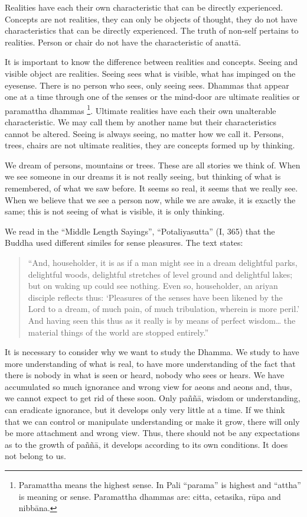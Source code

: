 Realities have each their own characteristic that can be directly
experienced. Concepts are not realities, they can only be objects of
thought, they do not have characteristics that can be directly
experienced. The truth of non-self pertains to realities. Person or
chair do not have the characteristic of anattā.

It is important to know the difference between realities and concepts.
Seeing and visible object are realities. Seeing sees what is visible,
what has impinged on the eyesense. There is no person who sees, only
seeing sees. Dhammas that appear one at a time through one of the senses
or the mind-door are ultimate realities or paramattha dhammas
\footnote{Paramattha means the
highest sense. In Pali ``parama'' is highest and ``attha'' is meaning or
sense. Paramattha dhammas are: citta, cetasika, rūpa and nibbāna.}. Ultimate realities have
each their own unalterable characteristic. We may call them by another
name but their characteristics cannot be altered. Seeing is always
seeing, no matter how we call it. Persons, trees, chairs are not
ultimate realities, they are concepts formed up by thinking.

We dream of persons, mountains or trees. These are all stories we think
of. When we see someone in our dreams it is not really seeing, but
thinking of what is remembered, of what we saw before. It seems so real,
it seems that we really see. When we believe that we see a person now,
while we are awake, it is exactly the same; this is not seeing of what
is visible, it is only thinking.

We read in the ``Middle Length Sayings'', ``Potaliyasutta'' (I, 365)
that the Buddha used different similes for sense pleasures. The text
states:

\begin{quote}
``And, householder, it is as if a man might see in a dream delightful
parks, delightful woods, delightful stretches of level ground and
delightful lakes; but on waking up could see nothing. Even so,
householder, an ariyan disciple reflects thus: `Pleasures of the senses
have been likened by the Lord to a dream, of much pain, of much
tribulation, wherein is more peril.' And having seen this thus as it
really is by means of perfect wisdom\ldots{} the material things of the
world are stopped entirely.''
\end{quote}



It is necessary to consider why we want to study the Dhamma. We study to
have more understanding of what is real, to have more understanding of
the fact that there is nobody in what is seen or heard, nobody who sees
or hears. We have accumulated so much ignorance and wrong view for aeons
and aeons and, thus, we cannot expect to get rid of these soon. Only
paññā, wisdom or understanding, can eradicate ignorance, but it develops
only very little at a time. If we think that we can control or
manipulate understanding or make it grow, there will only be more
attachment and wrong view. Thus, there should not be any expectations as
to the growth of paññā, it develops according to its own conditions. It
does not belong to us.

